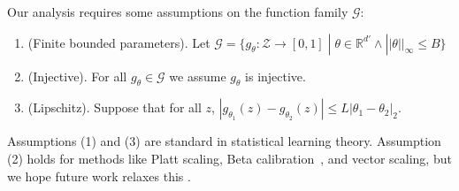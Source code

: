 Our analysis  requires some assumptions on the function family $\mathcal{G}$:
\begin{enumerate}
\item (Finite bounded parameters). Let $\mathcal{G} = \{ g_{\theta} : \mathcal{Z} \to [0, 1] \; | \; \theta \in \mathbb{R}^{d'} \wedge ||\theta||_{\infty} \leq B \}$
\item (Injective). For all $g_{\theta} \in \mathcal{G}$ we assume $g_{\theta}$ is injective.
\item (Lipschitz). Suppose that for all $z$, $|g_{\theta_1}(z) - g_{\theta_2}(z)| \leq L|\theta_1 - \theta_2|_2$.
\end{enumerate}

Assumptions (1) and (3) are standard in statistical learning theory. Assumption (2)  holds for methods like Platt scaling, Beta calibration~\cite{kull2017sigmoids}, and vector scaling, but we hope future work relaxes this .





